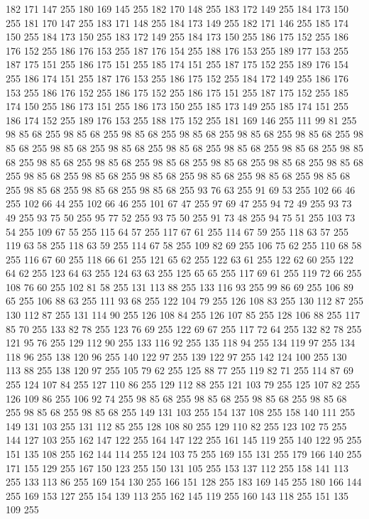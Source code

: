 182 171 147 255 180 169 145 255 182 170 148 255 183 172 149 255 184 173 150 255 181 170 147 255 183 171 148 255 184 173 149 255 182 171 146 255 185 174 150 255 184 173 150 255 183 172 149 255 184 173 150 255 186 175 152 255 186 176 152 255 186 176 153 255 187 176 154 255 188 176 153 255 189 177 153 255 187 175 151 255 186 175 151 255 185 174 151 255 187 175 152 255 189 176 154 255 186 174 151 255 187 176 153 255 186 175 152 255 184 172 149 255 186 176 153 255 186 176 152 255 186 175 152 255 186 175 151 255 187 175 152 255 185 174 150 255 186 173 151 255 186 173 150 255 185 173 149 255 185 174 151 255 186 174 152 255 189 176 153 255 188 175 152 255 181 169 146 255 111 99 81 255 98 85 68 255 98 85 68 255 98 85 68 255 98 85 68 255 98 85 68 255 98 85 68 255 98 85 68 255 98 85 68 255 98 85 68 255 98 85 68 255 98 85 68 255 98 85 68 255 98 85 68 255 98 85 68 255 98 85 68 255 98 85 68 255 98 85 68 255 98 85 68 255 98 85 68 255 98 85 68 255 98 85 68 255
98 85 68 255 98 85 68 255 98 85 68 255 98 85 68 255 98 85 68 255 98 85 68 255 98 85 68 255 93 76 63 255 91 69 53 255 102 66 46 255 102 66 44 255 102 66 46 255 101 67 47 255 97 69 47 255 94 72 49 255 93 73 49 255 93 75 50 255 95 77 52 255 93 75 50 255 91 73 48 255 94 75 51 255 103 73 54 255 109 67 55 255 115 64 57 255 117 67 61 255 114 67 59 255 118 63 57 255 119 63 58 255 118 63 59 255 114 67 58 255 109 82 69 255 106 75 62 255 110 68 58 255 116 67 60 255 118 66 61 255 121 65 62 255 122 63 61 255 122 62 60 255 122 64 62 255 123 64 63 255 124 63 63 255 125 65 65 255 117 69 61 255 119 72 66 255 108 76 60 255 102 81 58 255 131 113 88 255 133 116 93 255 99 86 69 255 106 89 65 255 106 88 63 255 111 93 68 255 122 104 79 255 126 108 83 255 130 112 87 255 130 112 87 255 131 114 90 255 126 108 84 255 126 107 85 255 128 106 88 255 117 85 70 255 133 82 78 255 123 76 69 255 122 69 67 255
117 72 64 255 132 82 78 255 121 95 76 255 129 112 90 255 133 116 92 255 135 118 94 255 134 119 97 255 134 118 96 255 138 120 96 255 140 122 97 255 139 122 97 255 142 124 100 255 130 113 88 255 138 120 97 255 105 79 62 255 125 88 77 255 119 82 71 255 114 87 69 255 124 107 84 255 127 110 86 255 129 112 88 255 121 103 79 255 125 107 82 255 126 109 86 255 106 92 74 255 98 85 68 255 98 85 68 255 98 85 68 255 98 85 68 255 98 85 68 255 98 85 68 255 149 131 103 255 154 137 108 255 158 140 111 255 149 131 103 255 131 112 85 255 128 108 80 255 129 110 82 255 123 102 75 255 144 127 103 255 162 147 122 255 164 147 122 255 161 145 119 255 140 122 95 255 151 135 108 255 162 144 114 255 124 103 75 255 169 155 131 255 179 166 140 255 171 155 129 255 167 150 123 255 150 131 105 255 153 137 112 255 158 141 113 255 133 113 86 255 169 154 130 255 166 151 128 255 183 169 145 255 180 166 144 255 169 153 127 255 154 139 113 255 162 145 119 255 160 143 118 255 151 135 109 255
